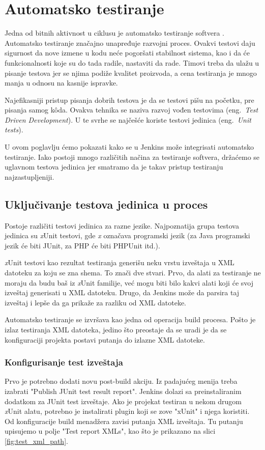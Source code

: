 \section{Automatsko testiranje}
Jedna od bitnih aktivnost u ciklusu je automatsko testiranje softvera \cite{jenkins:2011}. Automatsko testiranje značajno unapređuje razvojni proces. Ovakvi testovi daju sigurnost da nove izmene u kodu neće pogoršati stabilnost sistema, kao i da će funkcionalnosti koje su do tada radile, nastaviti da rade. Timovi treba da ulažu u pisanje testova jer se njima podiže kvalitet proizvoda, a cena testiranja je mnogo manja u odnosu na kasnije ispravke. 

Najefikasniji pristup pisanja dobrih testova je da se testovi pišu na početku, pre pisanja samog k\^oda. Ovakva tehnika se naziva razvoj vođen testovima (eng.~{\em Test Driven Development}). U te svrhe se najčešće koriste testovi jedinica (eng.~{\em Unit tests}). 

U ovom poglavlju ćemo pokazati kako se u Jenkins može integrisati automatsko testiranje. Iako postoji mnogo različitih načina za testiranje softvera, držaćemo se uglavnom testova jedinica jer smatramo da je takav pristup testiranju najzastupljeniji.

\subsection{Uključivanje testova jedinica u proces}
Postoje različiti testovi jedinica za razne jezike. Najpoznatija grupa testova jedinica su \textit{x}Unit testovi, gde \textit{x} označava programski jezik (za Java programski jezik će biti JUnit, za PHP će biti PHPUnit itd.). 

\textit{x}Unit testovi kao rezultat testiranja generišu neku vrstu izveštaja u XML datoteku za koju se zna shema. To znači dve stvari. Prvo, da alati za testiranje ne moraju da budu baš iz \textit{x}Unit familije, već mogu biti bilo kakvi alati koji će svoj izveštaj generisati u XML datoteku. Drugo, da Jenkins može da parsira taj izveštaj i lepše da ga prikaže za razliku od XML datoteke.

Automatsko testiranje se izvršava kao jedna od operacija build procesa. Pošto je izlaz testiranja XML datoteka, jedino što preostaje da se uradi je da se konfiguraciji projekta postavi putanja do izlazne XML datoteke.

\subsubsection{Konfigurisanje test izveštaja}
Prvo je potrebno dodati novu post-build akciju. Iz padajućeg menija treba izabrati "Publish JUnit test result report". Jenkins dolazi sa preinstaliranim dodatkom za JUnit test izveštaje. Ako je projekat testiran u nekom drugom \textit{x}Unit alatu, potrebno je instalirati plugin koji se zove "xUnit" i njega koristiti. Od konfiguracije build menadžera zavisi putanja XML izveštaja. Tu putanju upisujemo u polje "Test report XMLs", kao što je prikazano na slici \ref{fig:test_xml_path}. 

